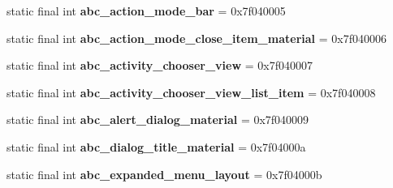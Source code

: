 \begin{DoxyCompactItemize}
\item 
\hypertarget{classandroid_1_1support_1_1v7_1_1appcompat_1_1_r_1_1layout_aec4f9e9f9a05a5ca2232a456cb5a6138}{}static final int {\bfseries abc\+\_\+action\+\_\+mode\+\_\+bar} = 0x7f040005\label{classandroid_1_1support_1_1v7_1_1appcompat_1_1_r_1_1layout_aec4f9e9f9a05a5ca2232a456cb5a6138}

\item 
\hypertarget{classandroid_1_1support_1_1v7_1_1appcompat_1_1_r_1_1layout_a5ca5842a7ac8daaf24b3ac54dddca7ac}{}static final int {\bfseries abc\+\_\+action\+\_\+mode\+\_\+close\+\_\+item\+\_\+material} = 0x7f040006\label{classandroid_1_1support_1_1v7_1_1appcompat_1_1_r_1_1layout_a5ca5842a7ac8daaf24b3ac54dddca7ac}

\item 
\hypertarget{classandroid_1_1support_1_1v7_1_1appcompat_1_1_r_1_1layout_aee776be71fc6f95ebb7fc202d1653d33}{}static final int {\bfseries abc\+\_\+activity\+\_\+chooser\+\_\+view} = 0x7f040007\label{classandroid_1_1support_1_1v7_1_1appcompat_1_1_r_1_1layout_aee776be71fc6f95ebb7fc202d1653d33}

\item 
\hypertarget{classandroid_1_1support_1_1v7_1_1appcompat_1_1_r_1_1layout_ac10665103daed966ab8508cf99909639}{}static final int {\bfseries abc\+\_\+activity\+\_\+chooser\+\_\+view\+\_\+list\+\_\+item} = 0x7f040008\label{classandroid_1_1support_1_1v7_1_1appcompat_1_1_r_1_1layout_ac10665103daed966ab8508cf99909639}

\item 
\hypertarget{classandroid_1_1support_1_1v7_1_1appcompat_1_1_r_1_1layout_ad53166dc6778d14218c6ca8d20e4e365}{}static final int {\bfseries abc\+\_\+alert\+\_\+dialog\+\_\+material} = 0x7f040009\label{classandroid_1_1support_1_1v7_1_1appcompat_1_1_r_1_1layout_ad53166dc6778d14218c6ca8d20e4e365}

\item 
\hypertarget{classandroid_1_1support_1_1v7_1_1appcompat_1_1_r_1_1layout_a12b7ab27647b0bb6ed58cf9504524932}{}static final int {\bfseries abc\+\_\+dialog\+\_\+title\+\_\+material} = 0x7f04000a\label{classandroid_1_1support_1_1v7_1_1appcompat_1_1_r_1_1layout_a12b7ab27647b0bb6ed58cf9504524932}

\item 
\hypertarget{classandroid_1_1support_1_1v7_1_1appcompat_1_1_r_1_1layout_a740ce0b38776f4d29c2e8813885ceb2e}{}static final int {\bfseries abc\+\_\+expanded\+\_\+menu\+\_\+layout} = 0x7f04000b\label{classandroid_1_1support_1_1v7_1_1appcompat_1_1_r_1_1layout_a740ce0b38776f4d29c2e8813885ceb2e}


\end{DoxyCompactItemize}
